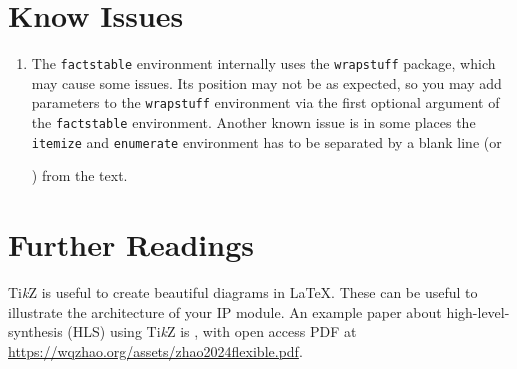 \documentclass{ip-doc}
\begin{document}
\section{Know Issues}
\begin{enumerate}
  \item The \texttt{factstable} environment internally uses the \texttt{wrapstuff} package, which may cause some issues.
  Its position may not be as expected, so you may add parameters to the \texttt{wrapstuff} environment via the first optional argument of the \texttt{factstable} environment.
  Another known issue is in some places the \texttt{itemize} and \texttt{enumerate} environment has to be separated by a blank line (or {\ttfamily\string\par\relax}) from the text.
\end{enumerate}

\section{Further Readings}
Ti\textit{k}Z is useful to create beautiful diagrams in \LaTeX.
These can be useful to illustrate the architecture of your IP module.
An example paper about high-level-synthesis (HLS) using Ti\textit{k}Z is \cite{zhao2024flexible},
with open access PDF at \url{https://wqzhao.org/assets/zhao2024flexible.pdf}.


{\small}
\end{document}
